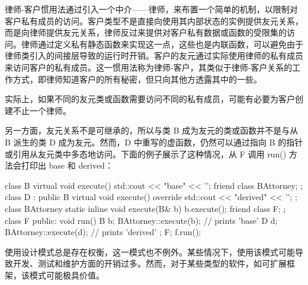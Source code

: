 
律师-客户惯用法通过引入一个中介——律师，来布置一个简单的机制，以限制对客户私有成员的访问。客户类型不是直接向使用其内部状态的实例提供友元关系，而是向律师提供友元关系，律师反过来提供对客户私有数据或函数的受限集的访问。律师通过定义私有静态函数来实现这一点，这些也是内联函数，可以避免由于律师类引入的间接层导致的运行时开销。客户的友元通过实际使用律师的私有成员来访问客户的私有成员。这一惯用法称为律师-客户，其类似于律师-客户关系的工作方式，即律师知道客户的所有秘密，但只向其他方透露其中的一些。

实际上，如果不同的友元类或函数需要访问不同的私有成员，可能有必要为客户创建不止一个律师。

另一方面，友元关系不是可继承的，所以与类 B 成为友元的类或函数并不是与从 B 派生的类 D 成为友元。然而，D 中重写的虚函数，仍然可以通过指向 B 的指针或引用从友元类中多态地访问。下面的例子展示了这种情况，从 F 调用 run() 方法会打印出 base 和 derived：

\begin{cpp}
class B
{
    virtual void execute() { std::cout << "base" << '\n'; }
    friend class BAttorney;
};
class D : public B
{
    virtual void execute() override
    { std::cout << "derived" << '\n'; }
};
class BAttorney
{
    static inline void execute(B& b)
    {
        b.execute();
    }
    friend class F;
};
class F
{
public:
    void run()
    {
        B b;
        BAttorney::execute(b); // prints 'base'
        D d;
        BAttorney::execute(d); // prints 'derived'
    }
};
F;
f.run();
\end{cpp}

使用设计模式总是存在权衡，这一模式也不例外。某些情况下，使用该模式可能导致开发、测试和维护方面的开销过多。然而，对于某些类型的软件，如可扩展框架，该模式可能极具价值。



